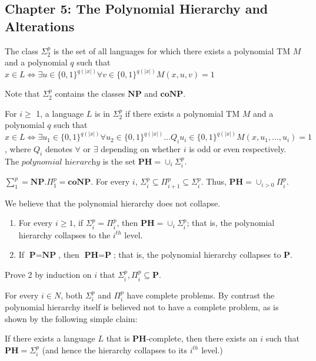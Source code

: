 \subsection*{Chapter 5: The Polynomial Hierarchy and Alterations}
\begin{note}
The class $\Sigma_{2}^{p}$ is the set of all languages for which there exists a polynomial TM $M$
and a polynomial $q$ such that
$x \in L \iff \exists u \in \{0,1\}^{q(|x|)} \forall v \in \{0,1\}^{q(|x|)} M(x, u, v) = 1 $

Note that $\Sigma_{2}^{p}$ contains the classes $\textbf{NP}$ and $\textbf{coNP}$.
\end{note}

\begin{note}
For $ i \geq$ 1, a language $L$ is in $\Sigma_{2}^{p}$ if there exists a polynomial TM $M$
and a polynomial $q$ such that
$x \in L \iff \exists u_{1} \in \{0,1\}^{q(|x|)} \forall u_{2} \in \{0,1\}^{q(|x|)} \ldots
Q_{i}u_{i} \in \{0,1\}^{q(|x|)} M(x, u_{1}, \ldots, u_{i}) = 1 $,
where $Q_i$ denotes $\forall$ or $\exists$ depending on whether $i$ is odd or even respectively.
The $\textit{polynomial hierarchy}$ is the set $\textbf{PH} = \cup_{i} \Sigma_{i}^{p}$.
\end{note}

\begin{note}
$\sum_{1}^{p} = \textbf{NP}. 
\Pi_{1}^{p} = \textbf{coNP}$. 
For every $i$, $\Sigma_{i}^{p} \subseteq \Pi_{i+1}^{p} \subseteq \Sigma_{i}^{p}.$ 
Thus, $\textbf{PH} = \cup_{i > 0} \Pi_{i}^{p}$.
\end{note}

\begin{note}[Collapse]
We believe that the polynomial hierarchy does not collapse.

\begin{enumerate}
	\item
		For every $i \geq 1$, if $\Sigma_{i}^{p} = \Pi_{i}^{p}$, then 
		$\textbf{PH} = \cup_{i} \Sigma_{i}^{p}$; that is, the polynomial hierarchy collapses
		to the $i^{th}$ level.
	\item
		If $\textbf{P} = \textbf{NP}$, then $\textbf{PH} = \textbf{P}$; that is, the polynomial
		hierarchy collapses to $\textbf{P}$.
\end{enumerate}
Prove 2 by induction on $i$ that $\Sigma_{i}^{p}, \Pi_{i}^{p} \subseteq \textbf{P}$.
\end{note}

\begin{note}
For every $i \in N$, both $\Sigma_{i}^{p}$ and $\Pi_{i}^{p}$ have complete problems. By contrast the polynomial hierarchy itself is believed not to have a complete problem, as is shown by the following simple claim:

If there exists a language $L$ that is $\textbf{PH}$-complete, then there exists an $i$ such that $\textbf{PH} = \Sigma_{i}^{p}$ (and hence the hierarchy collapses to its $i^{th}$ level.)
\end{note}

